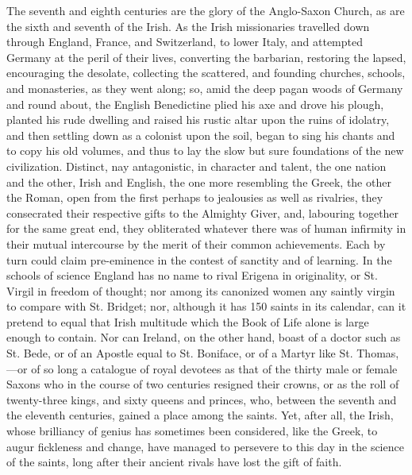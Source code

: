 The seventh and eighth centuries are the glory of the Anglo-Saxon
Church, as are the sixth and seventh of the Irish. As the Irish
missionaries travelled down through England, France, and Switzerland,
to lower Italy, and attempted Germany at the peril of their lives,
converting the barbarian, restoring the lapsed, encouraging the
desolate, collecting the scattered, and founding churches, schools,
and monasteries, as they went along; so, amid the deep pagan woods of
Germany and round about, the English Benedictine plied his axe and
drove his plough, planted his rude dwelling and raised his rustic
altar upon the ruins of idolatry, and then settling down as a colonist
upon the soil, began to sing his chants and to copy his old volumes,
and thus to lay the slow but sure foundations of the new civilization.
Distinct, nay antagonistic, in character and talent, the one nation
and the other, Irish and English, the one more resembling the Greek,
the other the Roman, open from the first perhaps to jealousies as well
as rivalries, they consecrated their respective gifts to the Almighty
Giver, and, labouring together for the same great end, they
obliterated whatever there was of human infirmity in their mutual
intercourse by the merit of their common achievements. Each by turn
could claim pre-eminence in the contest of sanctity and of learning.
In the schools of science England has no name to rival Erigena in
originality, or St. Virgil in freedom of thought; nor among its
canonized women any saintly virgin to compare with St. Bridget; nor,
although it has 150 saints in its calendar, can it pretend to
equal that Irish multitude which the Book of Life alone is large
enough to contain. Nor can Ireland, on the other hand, boast of a
doctor such as St. Bede, or of an Apostle equal to St. Boniface, or of
a Martyr like St. Thomas,—or of so long a catalogue of royal
devotees as that of the thirty male or female Saxons who in the course
of two centuries resigned their crowns, or as the roll of twenty-three
kings, and sixty queens and princes, who, between the seventh and the
eleventh centuries, gained a place among the saints. Yet, after all,
the Irish, whose brilliancy of genius has sometimes been considered,
like the Greek, to augur fickleness and change, have managed to
persevere to this day in the science of the saints, long after their
ancient rivals have lost the gift of faith.

